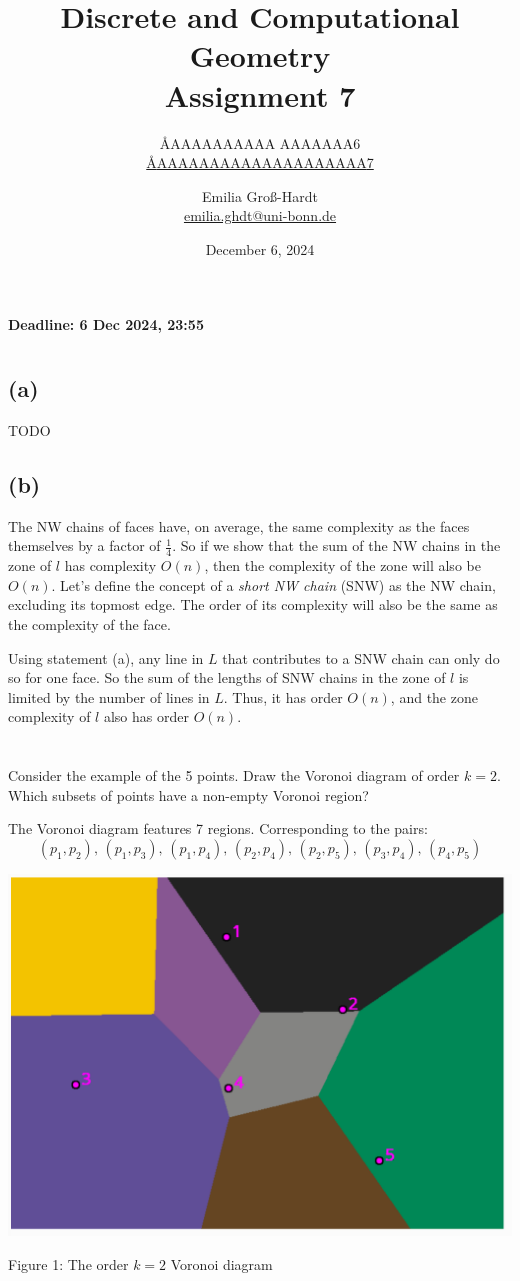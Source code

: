 \documentclass{article}
\title{Discrete and Computational Geometry \\ Assignment 7}
\author{
  \AA{AAAAAAAAAA AAAAAAA}{6} \\
  \href{mailto:\AA{AAAAAAAAAAAAAAAAAAAA}{7}}{\AA{AAAAAAAAAAAAAAAAAAAA}{7}}
  \and
  Emilia Groß-Hardt \\
  \href{mailto:emilia.ghdt@uni-bonn.de}{emilia.ghdt@uni-bonn.de}
}
\date{December 6, 2024}
\begin{document}
  \maketitle
  \begin{center}
    { \bfseries Deadline: 6 Dec 2024, 23:55 }
  \end{center}

  \section{}
  \subsection{(a)}
  TODO

  \subsection{(b)}
  The NW chains of faces have, on average, the same complexity as the faces themselves by a factor of $\frac14$.
  So if we show that the sum of the NW chains in the zone of $l$ has complexity $O(n)$,
  then the complexity of the zone will also be $O(n)$.
  Let's define the concept of a \textit{short NW chain} (SNW) as the NW chain, excluding its topmost edge.
  The order of its complexity will also be the same as the complexity of the face.

  Using statement (a), any line in $L$ that contributes to a SNW chain can only do so for one face.
  So the sum of the lengths of SNW chains in the zone of $l$ is limited by the number of lines in $L$.
  Thus, it has order $O(n)$, and the zone complexity of $l$ also has order $O(n)$.

  \section{}
  \begin{centerframebox}
    Consider the example of the 5 points. Draw the Voronoi diagram
    of order $k = 2$. Which subsets of points have a non-empty Voronoi region?
  \end{centerframebox}
  The Voronoi diagram features 7 regions.
  Corresponding to the pairs:
  \[(p_1,p_2),\, (p_1,p_3),\, (p_1,p_4),\, (p_2,p_4),\, (p_2,p_5),\, (p_3,p_4),\, (p_4,p_5)\]

  \begin{center}
    \includegraphics[width=.7\textwidth]{order-2}

    Figure 1: The order $k=2$ Voronoi diagram
  \end{center}
\end{document}
